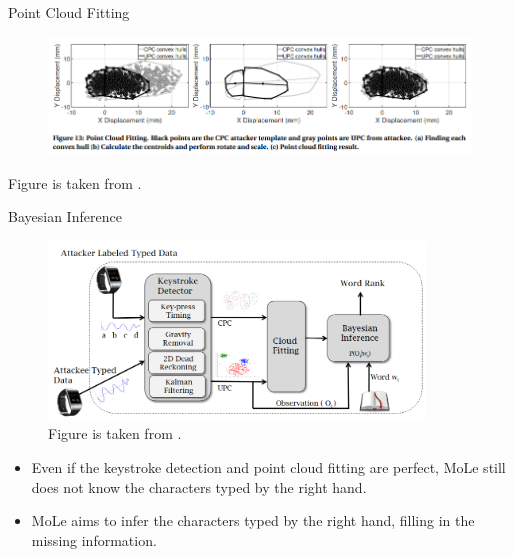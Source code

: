 \documentclass[ucs,9pt,usenames,dvipsnames]{beamer}
\begin{document}
\begin{frame}{Point Cloud Fitting}	
	\begin{figure}
		\centering
		\includegraphics[width=\linewidth]{imgs/pointCloudFitting}
	\end{figure}
	\tiny \centering
	Figure is taken from \cite{b3}.
\end{frame}



\begin{frame}{Bayesian Inference}
\begin{figure}
	\centering
	\includegraphics[width=10cm]{imgs/moleOverview}
	\caption{Figure is taken from \cite{b1}.}
\end{figure}
	\begin{itemize}
		\item Even if the keystroke detection and point cloud fitting are perfect, MoLe still does not know the characters typed by the right hand.
		\item MoLe aims to infer the characters typed by the right hand, filling in the missing information.
	\end{itemize}
\end{frame}
\end{document}
